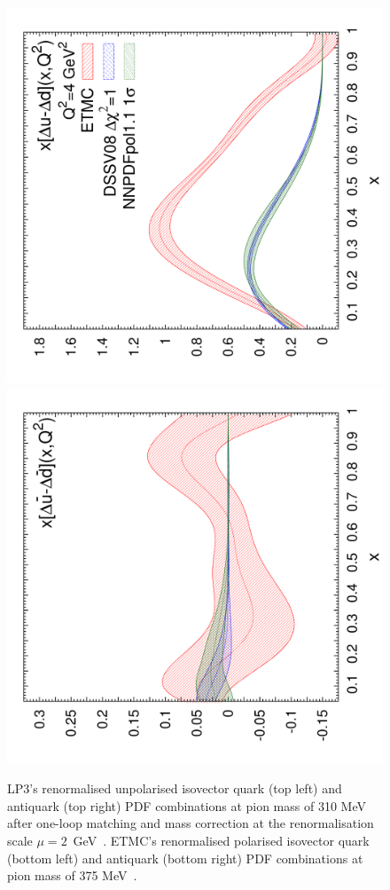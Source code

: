 \begin{figure}[!t]
\includegraphics[scale=0.22,angle=270]{plots/polxq}
\includegraphics[scale=0.22,angle=270]{plots/polxqbar}\\
\caption{\small LP3's renormalised unpolarised isovector quark (top left) and 
  antiquark (top right) PDF combinations at pion mass of 310 MeV after 
  one-loop matching and mass correction at the renormalisation scale 
  $\mu=2$~GeV~\cite{Chen:2017mzz}. 
  ETMC's renormalised polarised isovector quark (bottom left) and antiquark
  (bottom right) PDF combinations at pion mass of 
  375 MeV~\cite{Alexandrou:2017huk}.} 
\label{fig:qPDF-demo}
\end{figure}


